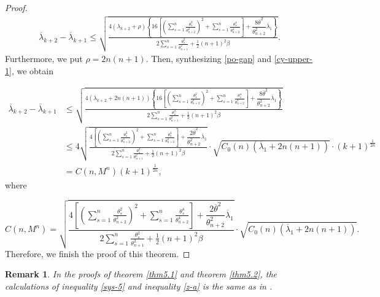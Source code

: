 \documentclass[12pt]{article}
\newtheorem{rem}[thm]{Remark}
\numberwithin{equation}{section}
\begin{document}
\begin{proof}
 \begin{equation}\begin{aligned}\label{po-gap}\overline{\lambda}_{k+2}-\overline{\lambda}_{k+1}
\leq\sqrt{\frac{4(\lambda_{k+2}+\rho)\left\{16\left[\left(\sum^{n}_{s=1}\frac{\theta_{s}^{2}}{\theta_{n+2}^{2}}\right)^{2}+\sum^{n}_{s=1}\frac{\theta_{s}^{4}}{\theta_{n+2}^{4}}\right]
+\dfrac{8\overline{\theta}^{2}}{\theta^{2}_{n+2}}\overline{\lambda}_{1}\right\}}
{2\sum^{n}_{s=1}\frac{\theta_{s}^{2}}{\theta_{n+1}^{2}}+\frac{1}{2}(n+1)^{2}\beta}}.
\end{aligned}\end{equation}
Furthermore, we put  $\rho=2n(n+1)$. Then, synthesizing \eqref{po-gap} and \eqref{cy-upper-1}, we obtain

\begin{equation*}\begin{aligned}\overline{\lambda}_{k+2}-\overline{\lambda}_{k+1}
&\leq\sqrt{\frac{4(\lambda_{k+2}+2n(n+1))\left\{16\left[\left(\sum^{n}_{s=1}\frac{\theta_{s}^{2}}{\theta_{n+2}^{2}}\right)^{2}+\sum^{n}_{s=1}\frac{\theta_{s}^{4}}{\theta_{n+2}^{4}}\right]
+\dfrac{8\overline{\theta}^{2}}{\theta^{2}_{n+2}}\overline{\lambda}_{1}\right\}}
{2\sum^{n}_{s=1}\frac{\theta_{s}^{2}}{\theta_{n+1}^{2}}+\frac{1}{2}(n+1)^{2}\beta}}\\
&\leq4\sqrt{\frac{4\left[\left(\sum^{n}_{s=1}\frac{\theta_{s}^{2}}{\theta_{n+2}^{2}}\right)^{2}+\sum^{n}_{s=1}\frac{\theta_{s}^{4}}{\theta_{n+2}^{4}}\right]
+\dfrac{2\overline{\theta}^{2}}{\theta^{2}_{n+2}}\overline{\lambda}_{1}}
{2\sum^{n}_{s=1}\frac{\theta_{s}^{2}}{\theta_{n+1}^{2}}+\frac{1}{2}(n+1)^{2}\beta}}\cdot\sqrt{C_{0}(n)(\overline{\lambda}_{1}+2n(n+1))}\cdot(k+1)^{\frac{1}{2n}}\\
&=C(n,M^{n})(k+1)^{\frac{1}{2n}},
\end{aligned}\end{equation*} where

\begin{equation*}C(n,M^{n})=\sqrt{\frac{4\left[\left(\sum^{n}_{s=1}\frac{\theta_{s}^{2}}{\theta_{n+2}^{2}}\right)^{2}+\sum^{n}_{s=1}\frac{\theta_{s}^{4}}{\theta_{n+2}^{4}}\right]
+\dfrac{2\overline{\theta}^{2}}{\theta^{2}_{n+2}}\overline{\lambda}_{1}}
{2\sum^{n}_{s=1}\frac{\theta_{s}^{2}}{\theta_{n+1}^{2}}+\frac{1}{2}(n+1)^{2}\beta}}\cdot\sqrt{C_{0}(n)(\overline{\lambda}_{1}+2n(n+1))}.\end{equation*}
Therefore, we finish the proof of this theorem.


\end{proof}
\begin{rem}In the proofs of theorem \ref{thm5.1} and theorem \ref{thm5.2}, the calculations of inequality \eqref{sys-5} and  inequality \eqref{z-a} is the same as in \cite{CY2}.\end{rem}
\end{document}
